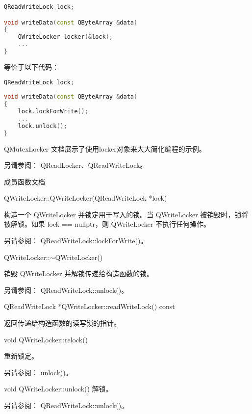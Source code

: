 \begin{lstlisting}[language=C++]
QReadWriteLock lock;

void writeData(const QByteArray &data)
{
	QWriteLocker locker(&lock);
	...
}
\end{lstlisting}

等价于以下代码：

\begin{lstlisting}[language=C++]
QReadWriteLock lock;
	
void writeData(const QByteArray &data)
{
	lock.lockForWrite();
	...
	lock.unlock();
}
\end{lstlisting}

QMutexLocker 文档展示了使用locker对象来大大简化编程的示例。

另请参阅： QReadLocker、QReadWriteLock。

成员函数文档

QWriteLocker::QWriteLocker(QReadWriteLock *lock)


构造一个 QWriteLocker 并锁定用于写入的锁。当 QWriteLocker 被销毁时，锁将被解锁。如果 lock == nullptr，则 QWriteLocker 不执行任何操作。

另请参阅： QReadWriteLock::lockForWrite()。

QWriteLocker::$\sim$QWriteLocker()

销毁 QWriteLocker 并解锁传递给构造函数的锁。

另请参阅： QReadWriteLock::unlock()。

QReadWriteLock *QWriteLocker::readWriteLock() const

返回传递给构造函数的读写锁的指针。

void QWriteLocker::relock()

重新锁定。

另请参阅： unlock()。

void QWriteLocker::unlock()
解锁。

另请参阅： QReadWriteLock::unlock()。

